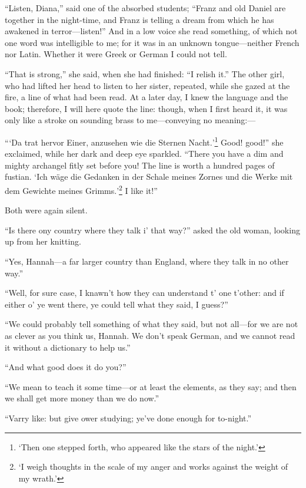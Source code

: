 \enquote{Listen, Diana,} said one of the absorbed students;
\enquote{Franz and old Daniel are together in the night-time, and Franz
is telling a dream from which he has awakened in terror---listen!} And
in a low voice she read something, of which not one word was
intelligible to me; for it was in an unknown tongue---neither French nor
Latin. Whether it were Greek or German I could not tell.

\enquote{That is strong,} she said, when she had finished: \enquote{I
relish it.} The other girl, who had lifted her head to listen to her
sister, repeated, while she gazed at the fire, a line of what had been
read. At a later day, I knew the language and the book; therefore, I
will here quote the line: though, when I first heard it, it was only
like a stroke on sounding brass to me---conveying no meaning:---

\enquote{\foreignquote{german}{Da trat hervor Einer, anzusehen wie die Sternen
Nacht.}\footnote{\enquote{Then one stepped forth, who appeared like the stars of the night.}}
Good! good!} she exclaimed, while her dark and deep eye
sparkled. \enquote{There you have a dim and mighty archangel fitly set
before you! The line is worth a hundred pages of fustian. 
\foreignquote{german}{Ich wäge die Gedanken in der Schale meines Zornes und die
Werke mit dem Gewichte meines Grimms.}\footnote{
\enquote{I weigh thoughts in the scale of my anger and works against the weight of my wrath.}} I like it!}

Both were again silent.

\enquote{Is there ony country where they talk i' that way?} asked the
old woman, looking up from her knitting.

\enquote{Yes, Hannah---a far larger country than England, where they
talk in no other way.}

\enquote{Well, for sure case, I knawn't how they can understand t' one
t'other: and if either o' ye went there, ye could tell what they said, I
guess?}

\enquote{We could probably tell something of what they said, but not
all---for we are not as clever as you think us, Hannah. We don't speak
German, and we cannot read it without a dictionary to help us.}

\enquote{And what good does it do you?}

\enquote{We mean to teach it some time---or at least the elements, as
they say; and then we shall get more money than we do now.}

\enquote{Varry like: but give ower studying; ye've done enough for
to-night.}

